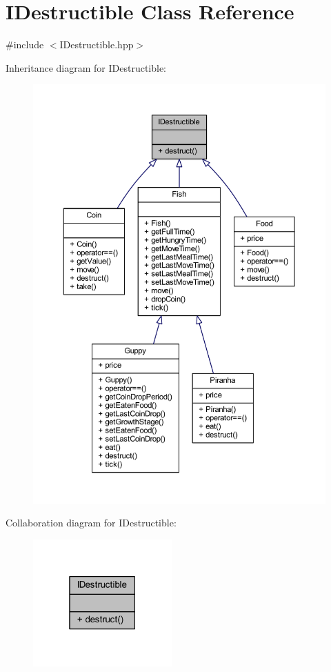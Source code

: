 \hypertarget{class_i_destructible}{}\section{I\+Destructible Class Reference}
\label{class_i_destructible}


{\ttfamily \#include $<$I\+Destructible.\+hpp$>$}



Inheritance diagram for I\+Destructible\+:
\nopagebreak
\begin{figure}[H]
\begin{center}
\leavevmode
\includegraphics[width=350pt]{class_i_destructible__inherit__graph}
\end{center}
\end{figure}


Collaboration diagram for I\+Destructible\+:
\nopagebreak
\begin{figure}[H]
\begin{center}
\leavevmode
\includegraphics[width=151pt]{class_i_destructible__coll__graph}
\end{center}
\end{figure}
